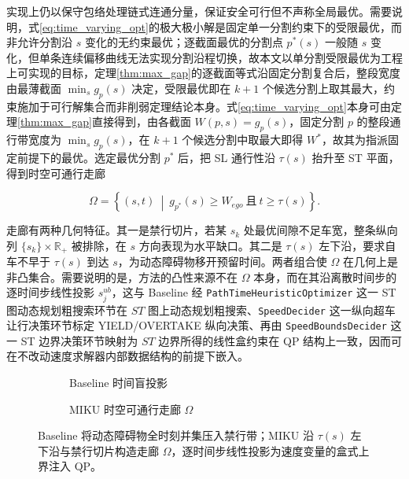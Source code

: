 \documentclass[a4paper,11pt]{ctexart}
\theoremstyle{definition}
\begin{document}
实现上仍以保守包络处理链式连通分量，保证安全可行但不声称全局最优。需要说明，式\eqref{eq:time_varying_opt}的极大极小解是固定单一分割约束下的受限最优，而非允许分割沿 $s$ 变化的无约束最优；逐截面最优的分割点 $p^{*}(s)$ 一般随 $s$ 变化，但单条连续偏移曲线无法实现分割沿程切换，故本文以单分割受限最优为工程上可实现的目标，定理\ref{thm:max_gap}的逐截面等式沿固定分割复合后，整段宽度由最薄截面 $\min_s g_p(s)$ 决定，受限最优即在 $k+1$ 个候选分割上取其最大，约束施加于可行解集合而非削弱定理结论本身。式\eqref{eq:time_varying_opt}本身可由定理\ref{thm:max_gap}直接得到，由各截面 $W(p,s)=g_p(s)$，固定分割 $p$ 的整段通行带宽度为 $\min_s g_p(s)$，在 $k+1$ 个候选分割中取最大即得 $W^{*}$，故其为指派固定前提下的最优。选定最优分割 $p^{*}$ 后，把 SL 通行性沿 $\tau(s)$ 抬升至 ST 平面，得到时空可通行走廊

\begin{equation}
    \Omega = \left\{ (s,t) \ \middle|\ g_{p^{*}}(s) \geq W_{ego}\ \text{且}\ t \geq \tau(s) \right\}.
    \label{eq:st_corridor}
\end{equation}

走廊有两种几何特征。其一是禁行切片，若某 $s_k$ 处最优间隙不足车宽，整条纵向列 $\{s_k\}\times\mathbb{R}_{+}$ 被排除，在 $s$ 方向表现为水平缺口。其二是 $\tau(s)$ 左下沿，要求自车不早于 $\tau(s)$ 到达 $s$，为动态障碍物移开预留时间。两者组合使 $\Omega$ 在几何上是非凸集合。需要说明的是，方法的凸性来源不在 $\Omega$ 本身，而在其沿离散时间步的逐时间步线性投影 $s_j^{ub}$，这与 Baseline 经 \texttt{PathTimeHeuristicOptimizer} 这一 ST 图动态规划粗搜索环节在 $ST$ 图上动态规划粗搜索、\texttt{SpeedDecider} 这一纵向超车让行决策环节标定 YIELD/OVERTAKE 纵向决策、再由 \texttt{SpeedBoundsDecider} 这一 ST 边界决策环节映射为 $ST$ 边界所得的线性盒约束在 QP 结构上一致，因而可在不改动速度求解器内部数据结构的前提下嵌入。

\begin{figure}[htbp]
\centering
\begin{subfigure}[b]{0.46\textwidth}
  \centering
  \caption{Baseline 时间盲投影}
\end{subfigure}\hfill
\begin{subfigure}[b]{0.46\textwidth}
  \centering
  \caption{MIKU 时空可通行走廊 $\Omega$}
\end{subfigure}
\caption{ST 平面上的时空可通行走廊与上界收紧}
\caption*{Baseline 将动态障碍物全时刻并集压入禁行带；MIKU 沿 $\tau(s)$ 左下沿与禁行切片构造走廊 $\Omega$，逐时间步线性投影为速度变量的盒式上界注入 QP。}
\label{fig:corridor}
\end{figure}
\end{document}

